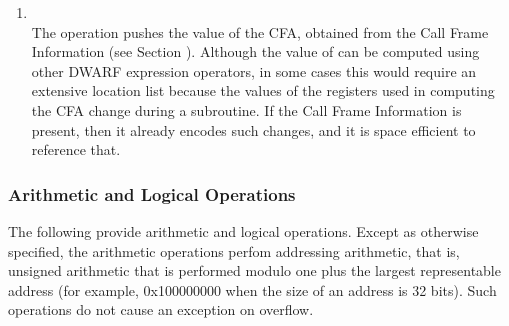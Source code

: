 \begin{enumerate}[1]
\item {} \\
The  operation pushes the value of the
CFA, obtained from the Call Frame Information 
(see Section ).
Although the value of 
can be computed using other DWARF expression operators,
in some cases this would require an extensive location list
because the values of the registers used in computing the
CFA change during a subroutine. If the 
Call Frame Information 
is present, then it already encodes such changes, and it is
space efficient to reference that.
\end{enumerate}

\subsubsection{Arithmetic and Logical Operations}
The 
following 
provide arithmetic and logical operations. Except
as otherwise specified, the arithmetic operations perfom
addressing arithmetic, that is, unsigned arithmetic that is
performed modulo one plus the largest representable address
(for example, 0x100000000 when the size of an address is 32
bits). Such operations do not cause an exception on overflow.

